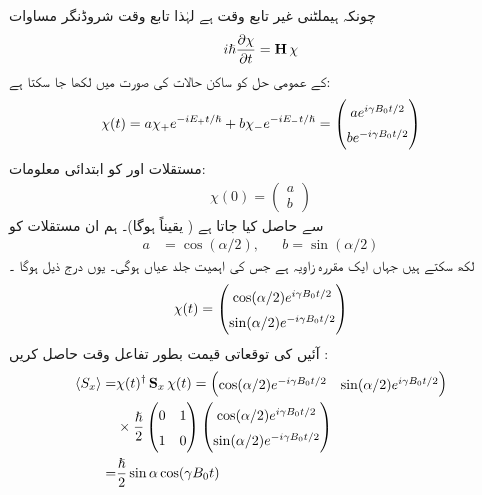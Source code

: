  چونکہ ہیملٹنی غیر تابع وقت ہے لہٰذا تابع وقت شروڈنگر مساوات 
\begin{align}\label{مساوات_تین_ابعادی_شروڈنگر_شائے_روپ}
i \hslash \frac{\partial \chi}{\partial t} = \operatorname{\mathbf{H}} \chi
\end{align}
کے عمومی حل کو ساکن حالات کی صورت میں لکھا جا سکتا ہے:
\begin{align*}
\chi (t) = a \chi_+ e^{- i E_{+} t/\hslash} + b \chi_{-} e^{- i E_{-} t / \hslash} = 
\begin{pmatrix}
\renewcommand{\arraystretch}{1.5}
a e^{i \gamma B_0 t /2} \\
b e^{- i \gamma B_0 t/2}
\end{pmatrix}
\end{align*}
مستقلات  اور  کو ابتدائی معلومات: 
\begin{align*}
\chi (0) = 
\begin{pmatrix}
a \\
b
\end{pmatrix}
\end{align*}
سے حاصل کیا جاتا ہے ( یقیناً   ہوگا)۔   ہم ان مستقلات کو
\begin{align*}
a& = \cos (\alpha/2), && b = \sin (\alpha/2)
\end{align*}
 لکھ سکتے ہیں جہاں  ایک مقررہ زاویہ ہے  جس کی اہمیت جلد  عیاں  ہوگی۔ یوں درج ذیل ہوگا ۔
\begin{align}
\renewcommand{\arraystretch}{1.5}
\chi(t) = 
\begin{pmatrix}
\cos (\alpha/2) e^{i \gamma B_0 t/2} \\
\sin (\alpha/2) e^{- i \gamma B_0 t /2}
\end{pmatrix}
\end{align}
آئیں  کی توقعاتی قیمت بطور تفاعل وقت حاصل کریں :
\begin{align}
\langle S_x \rangle =& \chi (t)^{\dagger} \mat{S}_x \chi (t) = 
\begin{pmatrix}
\cos(\alpha/2) e^{- i \gamma B_0 t/2} & \sin(\alpha/2) e^{i \gamma B_0 t/2} 
\end{pmatrix} \nonumber\\
& \times \frac{\hslash}{2}
\begin{pmatrix}
0 & 1 \\
1 & 0
\end{pmatrix}
\begin{pmatrix}
\cos(\alpha /2) e^{i \gamma B_0 t/2} \\
\sin(\alpha/2) e^{- i \gamma B_0 t/2}
\end{pmatrix} \nonumber \\
=& \frac{\hslash}{2} \sin \alpha \cos (\gamma B_0 t) 
\end{align}
